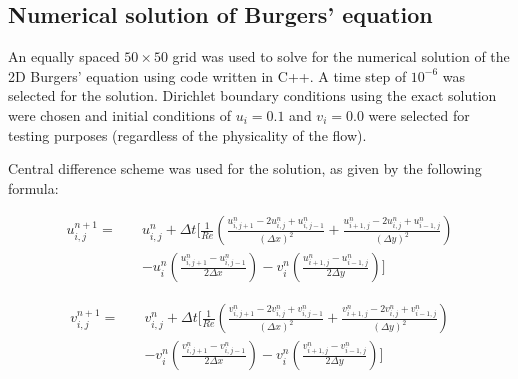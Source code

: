 \documentclass[12pt,a4paper,fleqn]{article}
\begin{document}
\subsection*{Numerical solution of Burgers' equation}
An equally spaced $50 \times 50$ grid was used to solve for the numerical
solution of the 2D Burgers' equation using code written in C++. A time step of
$10^{-6}$ was selected for the solution. Dirichlet boundary conditions using the
exact solution were chosen and initial conditions of $u_i = 0.1$ and $v_i = 0.0$
were selected for testing purposes (regardless of the physicality of the flow).

Central difference scheme was used for the solution, as given by the following
formula:

\begin{equation}
\begin{split}
u_{i,j}^{n+1}=\quad &u_{i,j}^n + \Delta t
\bigg[\frac{1}{Re}\left(\frac{u_{i,j+1}^n - 2u_{i,j}^n + u_{i,j-1}^n}{(\Delta
x)^2} + \frac{u_{i+1,j}^n - 2u_{i,j}^n + u_{i-1,j}^n}{(\Delta y)^2}\right)
\\&- u_i^n\left(\frac{u_{i,j+1}^n - u_{i,j-1}^n}{2\Delta x}\right) -
v_i^n\left(\frac{u_{i+1,j}^n - u_{i-1,j}^n}{2\Delta y} \right) \bigg]
\end{split}
\end{equation}

\begin{equation}
\begin{split}
v_{i,j}^{n+1}=\quad &v_{i,j}^n + \Delta t
\bigg[\frac{1}{Re}\left(\frac{v_{i,j+1}^n - 2v_{i,j}^n + v_{i,j-1}^n}{(\Delta
x)^2} + \frac{v_{i+1,j}^n - 2v_{i,j}^n + v_{i-1,j}^n}{(\Delta y)^2}\right)
\\&- v_i^n\left(\frac{v_{i,j+1}^n - v_{i,j-1}^n}{2\Delta x}\right) -
v_i^n\left(\frac{v_{i+1,j}^n - v_{i-1,j}^n}{2\Delta y} \right) \bigg]
\end{split}
\end{equation}
\end{document}
